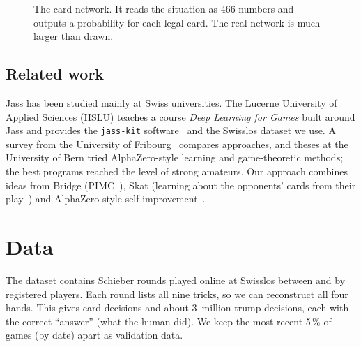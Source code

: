 \documentclass[10pt,a4paper]{article}
\begin{document}
\begin{figure}[h]
\centering
{}
\caption{The card network. It reads the situation as 466 numbers and outputs a probability for each legal card.
The real network is much larger than drawn.}
\label{fig:net}
\end{figure}

\subsection{Related work}\label{sec:related}
Jass has been studied mainly at Swiss universities. The Lucerne University of Applied Sciences (HSLU) teaches a
course \emph{Deep Learning for Games} built around Jass and provides the \texttt{jass-kit} software~\cite{jasskit} and
the Swisslos dataset we use. A survey from the University of Fribourg~\cite{survey} compares approaches, and theses at
the University of Bern tried AlphaZero-style learning and game-theoretic methods; the best programs reached the level of
strong amateurs. Our approach combines ideas from Bridge (PIMC~\cite{gib,long}), Skat (learning about the opponents'
cards from their play~\cite{skat}) and AlphaZero-style self-improvement~\cite{alphazero}.

\section{Data}\label{sec:data}
The dataset contains \NGames{} Schieber rounds played online at Swisslos between \DateFrom{} and \DateTo{} by
\NPlayers{} registered players. Each round lists all nine tricks, so we can reconstruct all four hands. This gives
\NCards{} card decisions and about 3~million trump decisions, each with the correct ``answer'' (what the human did).
We keep the most recent 5\,\% of games (by date) apart as validation data.
\end{document}
